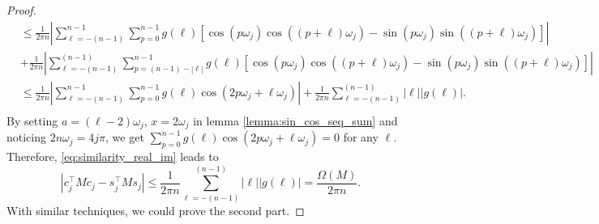 \begin{lem}
\begin{proof}
\begin{equation}
\begin{aligned}
 &\le \frac{1}{2\pi n} \left|\sum_{\ell 
 = -(n-1)}^{n-1} \sum_{p=0}^{n-1} g(\ell)\left[ \cos(p\omega_j)\cos((p+\ell)\omega_j) - \sin(p\omega_j)\sin((p+\ell)\omega_j)  \right]\right|\\
 &+\frac{1}{2\pi n}\left|\sum_{\ell=-(n-1)}^{(n-1)} \sum_{p=(n-1)-\left|\ell\right|}^{n-1} g(\ell)\left[ \cos(p\omega_j)\cos((p+\ell)\omega_j) - \sin(p\omega_j)\sin((p+\ell)\omega_j)\right]\right| \\
 &\le \frac{1}{2\pi n}\left|\sum_{\ell 
 = -(n-1)}^{n-1} \sum_{p=0}^{n-1} g(\ell)\cos(2p\omega_j+\ell\omega_j) \right|+ \frac{1}{2\pi n}\sum_{\ell = -(n-1)}^{(n-1)} |\ell| |g(\ell)|.\\
 \end{aligned}
\end{equation}
By setting $a = (\ell-2)\omega_j$, $x = 2\omega_j$ in lemma \ref{lemma:sin_cos_seq_sum} and noticing $2n\omega_j = 4j\pi$, we get $\sum_{p=0}^{n-1} g(\ell)\cos(2p\omega_j+\ell\omega_j) = 0$ for any $\ell$. Therefore, \eqref{eq:similarity_real_im} leads to 
\begin{equation}
 |c_j^\top M c_j - s_j^\top M s_j| \le \frac{1}{2\pi n}\sum_{\ell = -(n-1)}^{(n-1)} |\ell| |g(\ell)| = \frac{\Omega(M)}{2\pi n}. 
\end{equation}
With similar techniques, we could prove the second part. 
\end{proof}
\end{lem}
